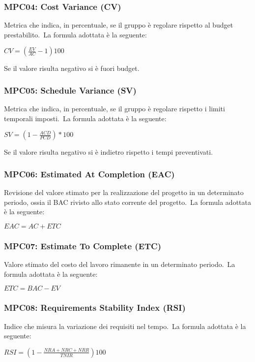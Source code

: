 \subsubsection{MPC04: Cost Variance (CV)}\label{sssec:cost_variance}
Metrica che indica, in percentuale, se il gruppo è regolare rispetto al budget prestabilito.\
La formula adottata è la seguente:
\begin{center}
    $CV = \displaystyle (\frac{EV}{AC}-1)100$
\end{center}
Se il valore risulta negativo si è fuori budget.
\subsubsection{MPC05: Schedule Variance (SV)}\label{sssec:schedule_variance}
Metrica che indica, in percentuale, se il gruppo è regolare rispetto i limiti temporali imposti.\
La formula adottata è la seguente:
\begin{center}
    $SV = \displaystyle (1-\frac{ACD}{PCD})*100$
\end{center}
Se il valore risulta negativo si è indietro rispetto i tempi preventivati.

\subsubsection{MPC06: Estimated At Completion (EAC)}\label{sssec:estimate_at_completition}
Revisione del valore stimato per la realizzazione del progetto in un determinato periodo, ossia il BAC rivisto allo stato corrente del progetto.\
La formula adottata è la seguente:
\begin{center}
    $EAC = AC + ETC$
\end{center}

\subsubsection{MPC07: Estimate To Complete (ETC)}\label{sssec:estimate_to_complete}
Valore stimato del costo del lavoro rimanente in un determinato periodo.\
La formula adottata è la seguente:
\begin{center}
    $ETC = BAC - EV$
\end{center}
\subsubsection{MPC08: Requirements Stability Index (RSI)}\label{sssec:requirement_stability_index}
Indice che misura la variazione dei requisiti nel tempo.\
La formula adottata è la seguente:
\begin{center}
    $RSI = \displaystyle (1-\frac{NRA + NRC + NRR}{TNIR})100$
\end{center}

